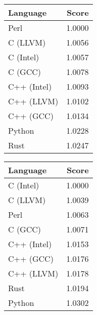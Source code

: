 \begin{subtable}{0.33\textwidth}
    \centering
    \caption{$k=1$}
    \label{table:energy:regexp(1)}
    \begin{tabular}{|l|r|}
        \hline
        Language & Score \\
        \hline
        Perl & 1.0000 \\
        C (LLVM) & 1.0056 \\
        C (Intel) & 1.0057 \\
        C (GCC) & 1.0078 \\
        C++ (Intel) & 1.0093 \\
        C++ (LLVM) & 1.0102 \\
        C++ (GCC) & 1.0134 \\
        Python & 1.0228 \\
        Rust & 1.0247 \\
        \hline
    \end{tabular}
\end{subtable}%
\begin{subtable}{0.33\textwidth}
    \centering
    \caption{$k=2$}
    \label{table:energy:regexp(2)}
    \begin{tabular}{|l|r|}
        \hline
        Language & Score \\
        \hline
        C (Intel) & 1.0000 \\
        C (LLVM) & 1.0039 \\
        Perl & 1.0063 \\
        C (GCC) & 1.0071 \\
        C++ (Intel) & 1.0153 \\
        C++ (GCC) & 1.0176 \\
        C++ (LLVM) & 1.0178 \\
        Rust & 1.0194 \\
        Python & 1.0302 \\
        \hline
    \end{tabular}
\end{subtable}%
